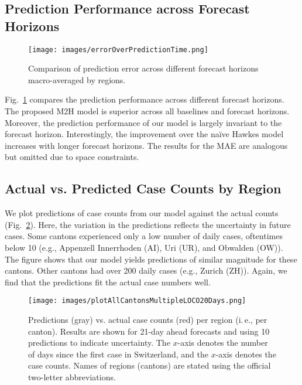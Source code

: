 \documentclass[sigconf, review = false, nonacm = true]{acmart}
\newcommand\model{M2H model\xspace}
\newcommand\ie{i.\,e.\xspace}
\begin{document}
\subsection{Prediction Performance across Forecast Horizons}

\begin{figure}[b]
  \centering
  \texttt{[image: images/errorOverPredictionTime.png]}
  \caption{Comparison of prediction error across different forecast horizons macro-averaged by regions.}
  \label{fig:differentHorizons}
\end{figure}

Fig.~\ref{fig:differentHorizons} compares the prediction performance across different forecast horizons. The proposed \model is superior across all baselines and forecast horizons. Moreover, the prediction performance of our model is largely invariant to the forecast horizon. Interestingly, the improvement over the na{\"i}ve Hawkes model increases with longer forecast horizons. The results for the MAE are analogous but omitted due to space constraints. 

\subsection{Actual vs. Predicted Case Counts by Region}

We plot predictions of case counts from our model against the actual counts (Fig.~\ref{fig:LOCOallCantons20days}). Here, the variation in the predictions reflects the uncertainty in future cases. Some cantons experienced only a low number of daily cases, oftentimes below 10 (e.g., Appenzell Innerrhoden (AI), Uri (UR), and Obwalden (OW)). The figure shows that our model yields predictions of similar magnitude for these cantons. Other cantons had over 200 daily cases (e.g., Zurich (ZH)). Again, we find that the predictions fit the actual case numbers well.

\begin{figure}[H]
  \centering
  \texttt{[image: images/plotAllCantonsMultipleLOCO20Days.png]}
  \caption{Predictions (gray) vs. actual case counts (red) per region (\ie, per canton). Results are shown for 21-day ahead forecasts and using 10 predictions to indicate uncertainty. The $x$-axis denotes the number of days since the first case in Switzerland, and the $x$-axis denotes the case counts. Names of regions (cantons) are stated using the official two-letter abbreviations. }
  \label{fig:LOCOallCantons20days}
\end{figure}
\end{document}
